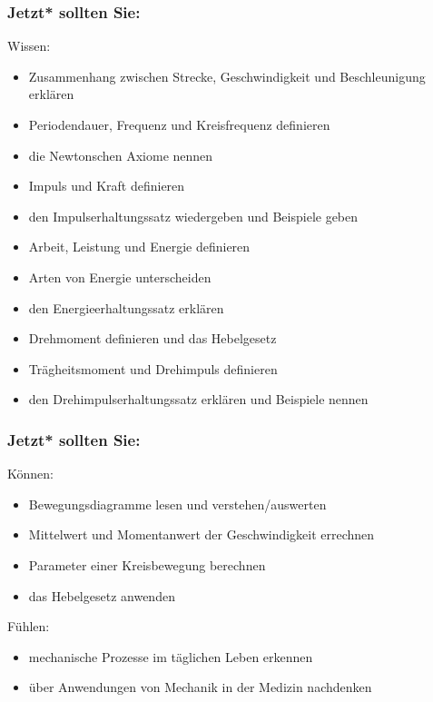 \documentclass{beamer}
\begin{document}
\begin{frame}

\frametitle{Jetzt* sollten Sie:}



\begin{block}{Wissen:}
\begin{itemize}
\item
Zusammenhang zwischen Strecke, Geschwindigkeit und Beschleunigung erklären
\item
Periodendauer, Frequenz und Kreisfrequenz definieren
\item
die Newtonschen Axiome nennen
\item
Impuls und Kraft definieren
\item
den  Impulserhaltungssatz wiedergeben und Beispiele geben
\item
Arbeit, Leistung und Energie definieren
\item
Arten von Energie unterscheiden
\item
den Energieerhaltungssatz erklären
\item
Drehmoment definieren und das Hebelgesetz
\item
Trägheitsmoment und Drehimpuls definieren
\item
den Drehimpulserhaltungssatz erklären und Beispiele nennen 
\end{itemize}

\end{block}

\end{frame}

\begin{frame}

\frametitle{Jetzt* sollten Sie:}
 



\begin{block}{Können:}
\begin{itemize}
\item
Bewegungsdiagramme lesen und verstehen/auswerten
\item
Mittelwert und Momentanwert der Geschwindigkeit errechnen
\item
Parameter einer Kreisbewegung berechnen
\item 
das Hebelgesetz anwenden
\end{itemize}
\end{block}


 
\begin{block}{Fühlen:}
\begin{itemize}
\item
mechanische Prozesse im täglichen Leben erkennen
\item
über Anwendungen von Mechanik in der Medizin nachdenken
\end{itemize}
\end{block}

 \end{frame}
\end{document}
